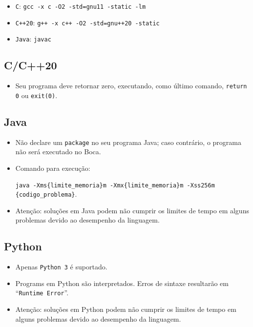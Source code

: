 \documentclass{article}
\begin{document}
\begin{titlepage}
\begin{itemize}
    \item \texttt{C}: \texttt{gcc -x c -O2 -std=gnu11 -static -lm}
    \item \texttt{C++20}: \texttt{g++ -x c++ -O2 -std=gnu++20 -static}
    \item \texttt{Java}: \texttt{javac}
\end{itemize}

\subsection{C/C++20}

\begin{itemize}
    \item Seu programa deve retornar zero, executando, como último comando, \texttt{return 0} ou \texttt{exit(0)}.
\end{itemize}

\subsection{Java}

\begin{itemize}
    \item Não declare um \texttt{package} no seu programa Java; caso contrário, o programa não será executado no Boca.
    \item Comando para execução:

	\texttt{java -Xms\{limite\_memoria\}m -Xmx\{limite\_memoria\}m -Xss256m \{codigo\_problema\}}.
    \item Atenção: soluções em Java podem não cumprir os limites de tempo em alguns problemas devido ao desempenho da linguagem.
\end{itemize}

\subsection{Python}

\begin{itemize}
    \item Apenas \texttt{Python 3} é suportado.
	\item Programs em Python são interpretados. Erros de sintaxe resultarão em ``\texttt{Runtime Error}''.
    \item Atenção: soluções em Python podem não cumprir os limites de tempo em alguns problemas devido ao desempenho da linguagem.
\end{itemize}


\end{titlepage}
\end{document}
